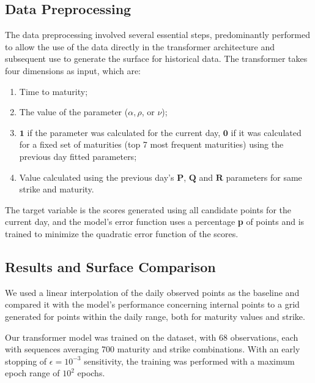 \subsection{Data Preprocessing}

The data preprocessing involved several essential steps, predominantly performed to allow the use of the data directly in the transformer architecture and subsequent use to generate the surface for historical data. The transformer takes four dimensions as input, which are:
\begin{enumerate}
	\item Time to maturity;
	\item The value of the parameter ($\alpha, \rho$, or $\nu$);
	\item $\mathbf{1}$ if the parameter was calculated for the current day, $\mathbf{0}$ if it was calculated for a fixed set of maturities (top 7 most frequent maturities) using the previous day fitted parameters;
	\item Value calculated using the previous day's $\mathbf{P}$, $\mathbf{Q}$ and $\mathbf{R}$ parameters for same strike and maturity.
\end{enumerate}

The target variable is the scores generated using all candidate points for the current day, and the model's error function uses a percentage \textbf{p} of points and is trained to minimize the quadratic error function of the scores.

\subsection{Results and Surface Comparison}

We used a linear interpolation of the daily observed points as the baseline and compared it with the model's performance concerning internal points to a grid generated for points within the daily range, both for maturity values and strike.

Our transformer model was trained on the dataset, with 68 observations, each with sequences averaging 700 maturity and strike combinations. With an early stopping of $\epsilon = 10^{-3}$ sensitivity, the training was performed with a maximum epoch range of $10^{2}$ epochs.

